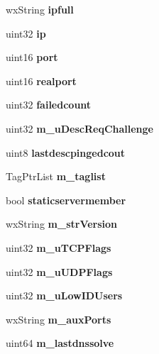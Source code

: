 \begin{DoxyCompactItemize}
\item 
wxString {\bfseries ipfull}\label{classCServer_af8ec6102b755c8c3a76a38b7dabc5a5e}

\item 
uint32 {\bfseries ip}\label{classCServer_a6d85b7e3cb888f15a7cab3f71df96382}

\item 
uint16 {\bfseries port}\label{classCServer_afa2942553c1abd2cb72f6fe381c2b104}

\item 
uint16 {\bfseries realport}\label{classCServer_a944d9ae8c14d26fb2677c95ab845a4c8}

\item 
uint32 {\bfseries failedcount}\label{classCServer_a38abb41daeaee6697ef3489838e8d75a}

\item 
uint32 {\bfseries m\_\-uDescReqChallenge}\label{classCServer_a6da1ed60b8d07ead629aa2932bcac08d}

\item 
uint8 {\bfseries lastdescpingedcout}\label{classCServer_aac1f035d6a5f95c66bc8c3e127169ead}

\item 
TagPtrList {\bfseries m\_\-taglist}\label{classCServer_ac9a47cdddab278eb79151e1e5a487bbf}

\item 
bool {\bfseries staticservermember}\label{classCServer_ab506fa04d714ad49e0de0c281cefd496}

\item 
wxString {\bfseries m\_\-strVersion}\label{classCServer_a781c1fe2ed1a1dcf89858ab7310d905b}

\item 
uint32 {\bfseries m\_\-uTCPFlags}\label{classCServer_a6580027e34739970c819b5203e5a8bd8}

\item 
uint32 {\bfseries m\_\-uUDPFlags}\label{classCServer_ac5fba94688d6b0cc02f1e7bf76429e5a}

\item 
uint32 {\bfseries m\_\-uLowIDUsers}\label{classCServer_a6614f1a1b62a83796cfc608e3d967e19}

\item 
wxString {\bfseries m\_\-auxPorts}\label{classCServer_a6af0ea5f0fa7ab853aa523c93fab336c}

\item 
uint64 {\bfseries m\_\-lastdnssolve}\label{classCServer_ab2a10114da9ed193194b36f2a53a84fe}


\end{DoxyCompactItemize}
